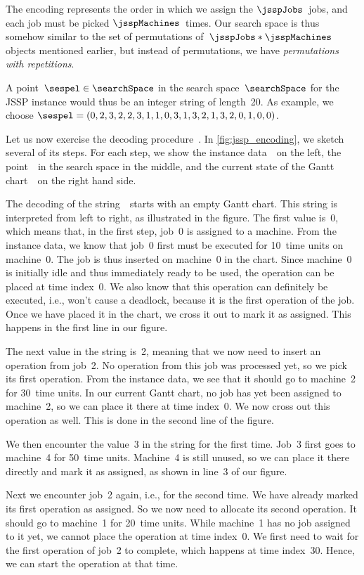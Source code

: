 The encoding represents the order in which we assign the $\jsspJobs$~jobs, and each job must be picked $\jsspMachines$~times.
Our search space is thus somehow similar to the set of permutations of~$\jsspJobs*\jsspMachines$ objects mentioned earlier, but instead of permutations, we have \emph{permutations with repetitions}.

A point~$\sespel\in\searchSpace$ in the search space~$\searchSpace$ for the  \gls{JSSP} instance would thus be an integer string of length~20.
As example, we choose $\sespel=(0, 2, 3, 2, 2, 3, 1, 1, 0, 3, 1, 3, 2, 1, 3, 2, 0, 1, 0, 0)$.

Let us now exercise the decoding procedure~\decodeOf{\sespel}.
In \autoref{fig:jssp_encoding}, we sketch several of its steps.
For each step, we show the instance data~\instance\ on the left, the point~\sespel\ in the search space in the middle, and the current state of the Gantt chart~\solspel\ on the right hand side.

The decoding of the string~\sespel\ starts with an empty Gantt chart.
This string is interpreted from left to right, as illustrated in the figure.
The first value is~0, which means that, in the first step, job~0 is assigned to a machine.
From the instance data, we know that job~0 first must be executed for 10~time units on machine~0.
The job is thus inserted on machine~0 in the chart.
Since machine~0 is initially idle and thus immediately ready to be used, the operation can be placed at time index~0.
We also know that this operation can definitely be executed, i.e., won't cause a deadlock, because it is the first operation of the job.
Once we have placed it in the chart, we cross it out to mark it as assigned.
This happens in the first line in our figure.

The next value in the string is~2, meaning that we now need to insert an operation from job~2.
No operation from this job was processed yet, so we pick its first operation.
From the instance data, we see that it should go to machine~2 for 30~time units.
In our current Gantt chart, no job has yet been assigned to machine~2, so we can place it there at time index~0.
We now cross out this operation as well.
This is done in the second line of the figure.

We then encounter the value~3 in the string for the first time.
Job~3 first goes to machine~4 for 50~time units.
Machine~4 is still unused, so we can place it there directly and mark it as assigned, as shown in line~3 of our figure.

Next we encounter job~2 again, i.e., for the second time.
We have already marked its first operation as assigned.
So we now need to allocate its second operation.
It should go to machine~1 for 20~time units.
While machine~1 has no job assigned to it yet, we cannot place the operation at time index~0.
We first need to wait for the first operation of job~2 to complete, which happens at time index~30.
Hence, we can start the operation at that time.

